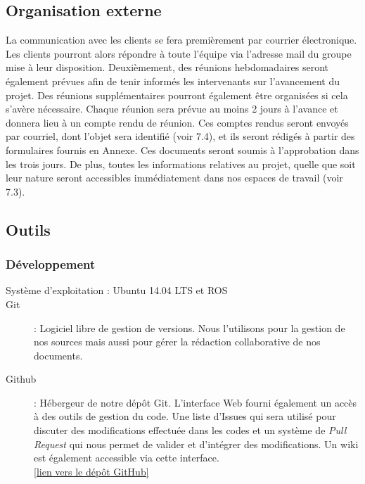 \documentclass[10pt,a4paper]{article}
\begin{document}
\subsection{Organisation externe}

La communication avec les clients se fera premièrement par courrier électronique. Les clients pourront alors répondre à toute l’équipe via l’adresse mail du groupe mise à leur disposition. Deuxièmement, des réunions hebdomadaires seront également prévues afin de tenir informés les intervenants sur l’avancement du projet. Des réunions supplémentaires pourront également être organisées si cela s’avère nécessaire. Chaque réunion sera prévue au moins 2 jours à l’avance et donnera lieu à un compte rendu de réunion. Ces comptes rendus seront envoyés par courriel, dont l’objet sera identifié (voir 7.4), et ils seront rédigés à partir des formulaires fournis en Annexe. Ces documents seront soumis à l’approbation dans les trois jours. De plus, toutes les informations relatives au projet, quelle que soit leur nature seront accessibles immédiatement dans nos espaces de travail (voir 7.3).

\subsection{Outils}

\subsubsection{Développement}
\begin{description}
\item [Système d'exploitation : Ubuntu 14.04 LTS et ROS]
\item [Git] : Logiciel libre de gestion de versions. Nous l'utilisons pour la gestion de nos sources mais aussi pour gérer la rédaction collaborative de nos documents.
\item [Github] : Hébergeur de notre dépôt Git. L'interface Web fourni également un accès à des outils de gestion du code. Une liste d'Issues qui sera utilisé pour discuter des modifications effectuée dans les codes et un système de \textit{Pull Request} qui nous permet de valider et d'intégrer des modifications. Un wiki est également accessible via cette interface.\\ \href{https://github.com/Projet-Navigation-UPS}{[lien vers le dépôt GitHub]} 
\end{description}
\end{document}
